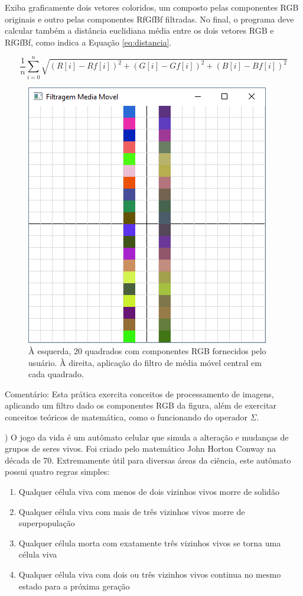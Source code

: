 \begin{renumerate}
  Exiba graficamente dois vetores coloridos, um composto pelas componentes RGB originais e outro pelas componentes RfGfBf filtradas. No final, o programa deve calcular também a distância euclidiana média entre os dois vetores RGB e RfGfBf, como indica a Equação \ref{eq:distancia}.

  \begin{equation} \label{eq:distancia}
  \frac{1}{n}\sum_{i = 0}^{n}\sqrt{(R[i] - Rf[i])^{2} + (G[i] - Gf[i])^{2} + (B[i] - Bf[i])^{2}}
\end{equation}

\begin{figure}[H]
    \centerline{\includegraphics[width=.3\textwidth]{img/cap2_ex26.png}}
    \caption{À esquerda, 20 quadrados com componentes RGB fornecidos pelo usuário. À direita, aplicação do filtro de média móvel central em cada quadrado.}
    \label{fig:cap02_ex26}
  \end{figure}

Comentário: Esta prática exercita conceitos de processamento de imagens, aplicando um filtro dado os componentes RGB da figura, além de exercitar conceitos teóricos de matemática, como o funcionando do operador $\Sigma$.

%

\item)
O jogo da vida é um autômato celular que simula a alteração e mudanças de grupos de seres vivos. Foi criado pelo matemático John Horton Conway na década de 70. Extremamente útil para diversas áreas da ciência, este autômato possui quatro regras simples:
  \begin{enumerate}
    \item Qualquer célula viva com menos de dois vizinhos vivos morre de solidão
    \item Qualquer célula viva com mais de três vizinhos vivos morre de superpopulação
    \item Qualquer célula morta com exatamente três vizinhos vivos se torna uma célula viva
    \item Qualquer célula viva com dois ou três vizinhos vivos continua no mesmo estado para a próxima geração
  \end{enumerate}
  

\end{renumerate}
